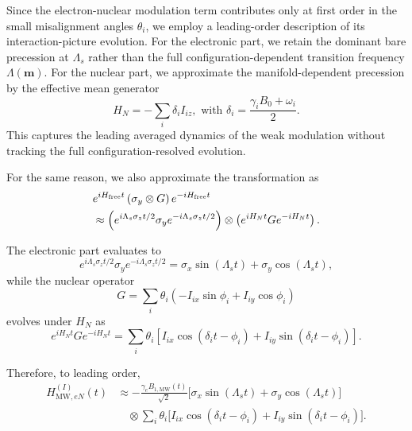 Since the electron-nuclear modulation term contributes only at first order in the small misalignment angles \(\theta_i\), we employ a leading-order description of its interaction-picture evolution. For the electronic part, we retain the dominant bare precession at \(\Lambda_s\) rather than the full configuration-dependent transition frequency \(\Lambda(\mathbf m)\). For the nuclear part, we approximate the manifold-dependent precession by the effective mean generator
\[
H_N
=
-\sum_i \delta_i I_{iz},
\,\, \text{with}\,\,
\delta_i
=
\frac{\gamma_iB_0+\omega_i}{2}.
\]
This captures the leading averaged dynamics of the weak modulation without
tracking the full configuration-resolved evolution.

For the same reason, we also approximate the transformation as
\begin{equation}
\begin{aligned}
&e^{iH_{\mathrm{free}}t}
\left(
\sigma_y\otimes G
\right)
e^{-iH_{\mathrm{free}}t}
\notag\\
&\approx
\left(
e^{i\Lambda_s\sigma_z t/2}
\sigma_y
e^{-i\Lambda_s\sigma_z t/2}
\right)
\otimes
\left(
e^{iH_N t}
G
e^{-iH_N t}
\right).
\end{aligned}
\label{eq:sigmayG_factorized}
\end{equation}

The electronic part evaluates to
\[
e^{i\Lambda_s\sigma_z t/2}
\sigma_y
e^{-i\Lambda_s\sigma_z t/2}
=
\sigma_x\sin(\Lambda_s t)
+
\sigma_y\cos(\Lambda_s t),
\]
while the nuclear operator
\[
G
=
\sum_i\theta_i
\left(
-I_{ix}\sin\phi_i
+
I_{iy}\cos\phi_i
\right)
\]
evolves under \(H_N\) as
\[
e^{iH_N t}
G
e^{-iH_N t}
=
\sum_i\theta_i
\left[
I_{ix}\cos(\delta_i t-\phi_i)
+
I_{iy}\sin(\delta_i t-\phi_i)
\right].
\]

Therefore, to leading order,
\begin{equation}
\begin{aligned}
H_{\mathrm{MW},eN}^{(I)}(t)
&\approx
-\frac{\gamma_e B_{1,\mathrm{MW}}(t)}{\sqrt2}
\big[
\sigma_x\sin(\Lambda_s t)
+
\sigma_y\cos(\Lambda_s t)
\big]
\\
&\quad\otimes
\sum_i\theta_i
\big[
I_{ix}\cos(\delta_i t-\phi_i)
+
I_{iy}\sin(\delta_i t-\phi_i)
\big].
\end{aligned}
\label{eq:HeN_I}
\end{equation}


